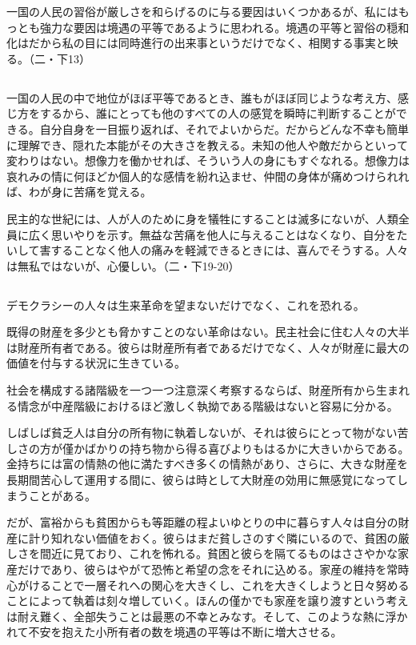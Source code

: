 一国の人民の習俗が厳しさを和らげるのに与る要因はいくつかあるが、私にはもっとも強力な要因は境遇の平等であるように思われる。境遇の平等と習俗の穏和化はだから私の目には同時進行の出来事というだけでなく、相関する事実と映る。（二・下13）

\subsection{}



一国の人民の中で地位がほぼ平等であるとき、誰もがほぼ同じような考え方、感じ方をするから、誰にとっても他のすべての人の感覚を瞬時に判断することができる。自分自身を一目振り返れば、それでよいからだ。だからどんな不幸も簡単に理解でき、隠れた本能がその大きさを教える。未知の他人や敵だからといって変わりはない。想像力を働かせれば、そういう人の身にもすぐなれる。想像力は哀れみの情に何ほどか個人的な感情を紛れ込ませ、仲間の身体が痛めつけられれば、わが身に苦痛を覚える。

民主的な世紀には、人が人のために身を犠牲にすることは滅多にないが、人類全員に広く思いやりを示す。無益な苦痛を他人に与えることはなくなり、自分をたいして害することなく他人の痛みを軽減できるときには、喜んでそうする。人々は無私ではないが、心優しい。（二・下19-20）

\subsection{}




デモクラシーの人々は生来革命を望まないだけでなく、これを恐れる。

既得の財産を多少とも脅かすことのない革命はない。民主社会に住む人々の大半は財産所有者である。彼らは財産所有者であるだけでなく、人々が財産に最大の価値を付与する状況に生きている。

社会を構成する諸階級を一つ一つ注意深く考察するならば、財産所有から生まれる情念が中産階級におけるほど激しく執拗である階級はないと容易に分かる。

しばしば貧乏人は自分の所有物に執着しないが、それは彼らにとって物がない苦しさの方が僅かばかりの持ち物から得る喜びよりもはるかに大きいからである。金持ちには富の情熱の他に満たすべき多くの情熱があり、さらに、大きな財産を長期間苦心して運用する間に、彼らは時として大財産の効用に無感覚になってしまうことがある。

だが、富裕からも貧困からも等距離の程よいゆとりの中に暮らす人々は自分の財産に計り知れない価値をおく。彼らはまだ貧しさのすぐ隣にいるので、貧困の厳しさを間近に見ており、これを怖れる。貧困と彼らを隔てるものはささやかな家産だけであり、彼らはやがて恐怖と希望の念をそれに込める。家産の維持を常時心がけることで一層それへの関心を大きくし、これを大きくしようと日々努めることによって執着は刻々増していく。ほんの僅かでも家産を譲り渡すという考えは耐え難く、全部失うことは最悪の不幸とみなす。そして、このような熱に浮かれて不安を抱えた小所有者の数を境遇の平等は不断に増大させる。

